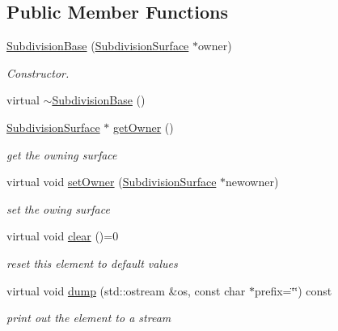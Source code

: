 \subsection*{Public Member Functions}
\begin{DoxyCompactItemize}
\item 
\hyperlink{classShipCADGeometry_1_1SubdivisionBase_ad424b99e73d138f565a152ed0ee648cb}{Subdivision\-Base} (\hyperlink{classShipCADGeometry_1_1SubdivisionSurface}{Subdivision\-Surface} $\ast$owner)
\begin{DoxyCompactList}\small\item\em Constructor. \end{DoxyCompactList}\item 
virtual \hyperlink{classShipCADGeometry_1_1SubdivisionBase_a12b4adebcd9fb52d4d82d9ff469e144d}{$\sim$\-Subdivision\-Base} ()
\item 
\hyperlink{classShipCADGeometry_1_1SubdivisionSurface}{Subdivision\-Surface} $\ast$ \hyperlink{classShipCADGeometry_1_1SubdivisionBase_a6003c22ab0149e6f01beff5dde397370}{get\-Owner} ()
\begin{DoxyCompactList}\small\item\em get the owning surface \end{DoxyCompactList}\item 
virtual void \hyperlink{classShipCADGeometry_1_1SubdivisionBase_a8e4716f15f6a81c2c5dd26b9931ecb91}{set\-Owner} (\hyperlink{classShipCADGeometry_1_1SubdivisionSurface}{Subdivision\-Surface} $\ast$newowner)
\begin{DoxyCompactList}\small\item\em set the owing surface \end{DoxyCompactList}\item 
virtual void \hyperlink{classShipCADGeometry_1_1SubdivisionBase_ae668920d97c0810c72996a531e0ca107}{clear} ()=0
\begin{DoxyCompactList}\small\item\em reset this element to default values \end{DoxyCompactList}\item 
virtual void \hyperlink{classShipCADGeometry_1_1SubdivisionBase_a7807e64ac8d2acc3da572e03cf0523b6}{dump} (std\-::ostream \&os, const char $\ast$prefix=\char`\"{}\char`\"{}) const 
\begin{DoxyCompactList}\small\item\em print out the element to a stream \end{DoxyCompactList}\end{DoxyCompactItemize}
